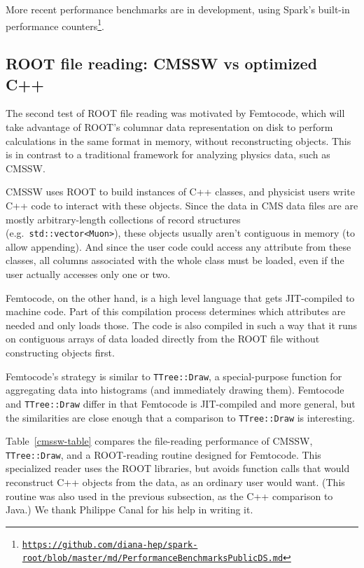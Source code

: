 \documentclass[12pt]{article}
\begin{document}
More recent performance benchmarks are in development, using Spark's built-in performance counters\footnote{\href{https://github.com/diana-hep/spark-root/blob/master/md/PerformanceBenchmarksPublicDS.md}{\tt https://github.com/diana-hep/spark-root/blob/master/md/PerformanceBenchmarksPublicDS.md}}.

\subsection*{ROOT file reading: CMSSW vs optimized C++}

The second test of ROOT file reading was motivated by Femtocode, which will take advantage of ROOT's columnar data representation on disk to perform calculations in the same format in memory, without reconstructing objects. This is in contrast to a traditional framework for analyzing physics data, such as CMSSW.

CMSSW uses ROOT to build instances of C++ classes, and physicist users write C++ code to interact with these objects. Since the data in CMS data files are are mostly arbitrary-length collections of record structures (e.g.\ {\tt std::vector<Muon>}), these objects usually aren't contiguous in memory (to allow appending). And since the user code could access any attribute from these classes, all columns associated with the whole class must be loaded, even if the user actually accesses only one or two.

Femtocode, on the other hand, is a high level language that gets JIT-compiled to machine code. Part of this compilation process determines which attributes are needed and only loads those. The code is also compiled in such a way that it runs on contiguous arrays of data loaded directly from the ROOT file without constructing objects first.

Femtocode's strategy is similar to {\tt TTree::Draw}, a special-purpose function for aggregating data into histograms (and immediately drawing them). Femtocode and {\tt TTree::Draw} differ in that Femtocode is JIT-compiled and more general, but the similarities are close enough that a comparison to {\tt TTree::Draw} is interesting.

Table~\ref{cmssw-table} compares the file-reading performance of CMSSW, {\tt TTree::Draw}, and a ROOT-reading routine designed for Femtocode. This specialized reader uses the ROOT libraries, but avoids function calls that would reconstruct C++ objects from the data, as an ordinary user would want. (This routine was also used in the previous subsection, as the C++ comparison to Java.) We thank Philippe Canal for his help in writing it.
\end{document}
